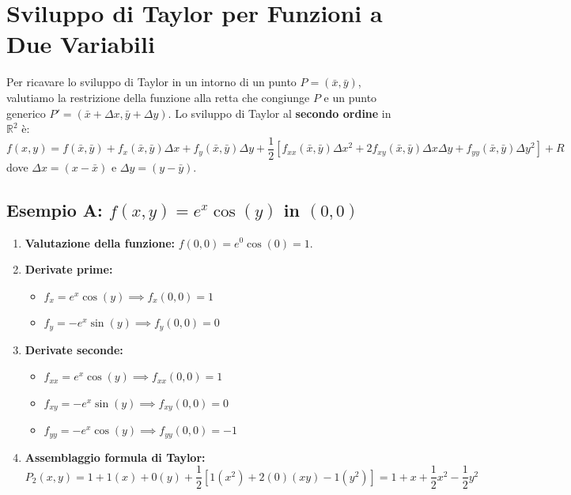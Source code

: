 \section{Sviluppo di Taylor per Funzioni a Due Variabili}

Per ricavare lo sviluppo di Taylor in un intorno di un punto $P=(\bar{x}, \bar{y})$, valutiamo la restrizione della funzione alla retta che congiunge $P$ e un punto generico $P'=(\bar{x}+\Delta x, \bar{y}+\Delta y)$.
Lo sviluppo di Taylor al \textbf{secondo ordine} in $\mathbb{R}^2$ è:
\[ f(x,y) = f(\bar{x}, \bar{y}) + f_x(\bar{x}, \bar{y})\Delta x + f_y(\bar{x}, \bar{y})\Delta y + \frac{1}{2}\left[ f_{xx}(\bar{x}, \bar{y})\Delta x^2 + 2f_{xy}(\bar{x}, \bar{y})\Delta x\Delta y + f_{yy}(\bar{x}, \bar{y})\Delta y^2 \right] + R \]
dove $\Delta x = (x - \bar{x})$ e $\Delta y = (y - \bar{y})$.

\subsection{Esempio A:  $f(x,y) = e^x \cos(y)$ in $(0,0)$}
\begin{enumerate}
    \item \textbf{Valutazione della funzione:} $f(0,0) = e^0 \cos(0) = 1$.
    \item \textbf{Derivate prime:} 
    \begin{itemize}
        \item $f_x = e^x \cos(y) \implies f_x(0,0) = 1$
        \item $f_y = -e^x \sin(y) \implies f_y(0,0) = 0$
    \end{itemize}
    \item \textbf{Derivate seconde:}
    \begin{itemize}
        \item $f_{xx} = e^x \cos(y) \implies f_{xx}(0,0) = 1$
        \item $f_{xy} = -e^x \sin(y) \implies f_{xy}(0,0) = 0$
        \item $f_{yy} = -e^x \cos(y) \implies f_{yy}(0,0) = -1$
    \end{itemize}
    \item \textbf{Assemblaggio formula di Taylor:}
    \[ P_2(x,y) = 1 + 1(x) + 0(y) + \frac{1}{2}\left[1(x^2) + 2(0)(xy) - 1(y^2)\right] = 1 + x + \frac{1}{2}x^2 - \frac{1}{2}y^2 \]
\end{enumerate}


